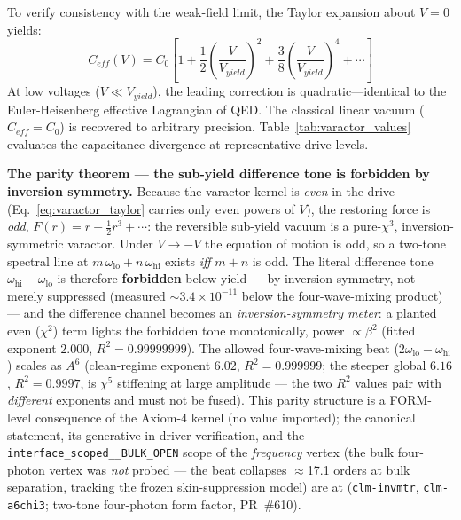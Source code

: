 To verify consistency with the weak-field limit, the Taylor expansion about $V = 0$ yields:
\begin{equation}
    C_{eff}(V) = C_0 \left[1 + \frac{1}{2}\left(\frac{V}{V_{yield}}\right)^{\!2} + \frac{3}{8}\left(\frac{V}{V_{yield}}\right)^{\!4} + \cdots\right]
    \label{eq:varactor_taylor}
\end{equation}
At low voltages ($V \ll V_{yield}$), the leading correction is quadratic---identical to the Euler-Heisenberg effective Lagrangian of QED. The classical linear vacuum ($C_{eff} = C_0$) is recovered to arbitrary precision. Table~\ref{tab:varactor_values} evaluates the capacitance divergence at representative drive levels.

\medskip\noindent\textbf{The parity theorem --- the sub-yield difference tone is forbidden by inversion symmetry.} Because the varactor kernel is \emph{even} in the drive (Eq.~\ref{eq:varactor_taylor} carries only even powers of $V$), the restoring force is \emph{odd}, $F(r) = r + \tfrac12 r^3 + \cdots$: the reversible sub-yield vacuum is a pure-$\chi^3$, inversion-symmetric varactor. Under $V \to -V$ the equation of motion is odd, so a two-tone spectral line at $m\,\omega_{\text{lo}} + n\,\omega_{\text{hi}}$ exists \emph{iff} $m+n$ is odd. The literal difference tone $\omega_{\text{hi}} - \omega_{\text{lo}}$ is therefore \textbf{forbidden} below yield --- by inversion symmetry, not merely suppressed (measured $\sim\!3.4\times10^{-11}$ below the four-wave-mixing product) --- and the difference channel becomes an \emph{inversion-symmetry meter}: a planted even ($\chi^2$) term lights the forbidden tone monotonically, power $\propto\beta^2$ (fitted exponent $2.000$, $R^2 = 0.99999999$). The allowed four-wave-mixing beat ($2\omega_{\text{lo}} - \omega_{\text{hi}}$) scales as $A^6$ (clean-regime exponent $6.02$, $R^2 = 0.999999$; the steeper global $6.16$, $R^2 = 0.9997$, is $\chi^5$ stiffening at large amplitude --- the two $R^2$ values pair with \emph{different} exponents and must not be fused). This parity structure is a FORM-level consequence of the Axiom-4 kernel (no value imported); the canonical statement, its generative in-driver verification, and the \texttt{interface\_scoped\_\_BULK\_OPEN} scope of the \emph{frequency} vertex (the bulk four-photon vertex was \emph{not} probed --- the beat collapses $\approx$17.1 orders at bulk separation, tracking the frozen skin-suppression model) are at  (\texttt{clm-invmtr}, \texttt{clm-a6chi3}; two-tone four-photon form factor, PR~\#610).

